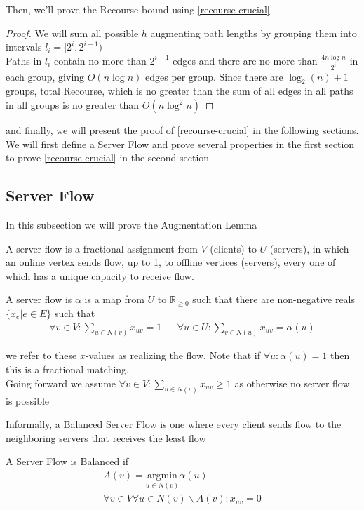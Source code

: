 Then, we'll prove the Recourse bound using \autoref{recourse-crucial}
\begin{proof}
	We will sum all possible $h$ augmenting path lengths by grouping them into intervals $l_i=[2^i,2^{i+1})$\\
	Paths in $l_i$ contain no more than $2^{i+1}$ edges and there are no more than $\frac{4n\log n}{2^i}$ in each group, giving $O(n\log n)$ edges per group.
	Since there are $\log_2(n)+1$ groups, total Recourse, which is no greater than the sum of all edges in all paths in all groups is no greater than $O(n \log^2n)$
\end{proof}

and finally, we will present the proof of \autoref{recourse-crucial} in the following sections. We will first define a Server Flow and prove several properties in the first section to prove \autoref{recourse-crucial} in the second section

\subsection{Server Flow}
In this subsection we will prove the Augmentation Lemma

A server flow is a fractional assignment from $V$ (clients) to $U$ (servers), in which an online vertex sends flow, up to 1, to offline vertices (servers), every one of which has a unique capacity to receive flow.
\begin{definition}
	A server flow is $\alpha$ is a map from $U$ to $\mathbb{R}_{\geq 0}$ such that there are non-negative reals $\{x_e|e\in E\}$ such that
	\begin{align*}
		\forall v\in V:\sum\limits_{u\in N(v)}x_{uv}=1 && \forall u\in U:\sum\limits_{v\in N(u)}x_{uv}=\alpha(u)
	\end{align*}
\end{definition}
we refer to these $x$-values as realizing the flow. Note that if $\forall u:\alpha(u)=1$ then this is a fractional matching.\\
Going forward we assume $\forall v\in V:\sum\limits_{u\in N(v)}x_{uv}\geq 1$ as otherwise no server flow is possible

Informally, a Balanced Server Flow is one where every client sends flow to the neighboring servers that receives the least flow
\begin{definition}
	A Server Flow is Balanced if
	\begin{align*}
		A(v)= \underset{u\in N(v)}{\mathrm{argmin}}\alpha(u)\\
		\forall v\in V\forall u\in N(v)\backslash A(v):x_{uv}=0
	\end{align*}
\end{definition}

